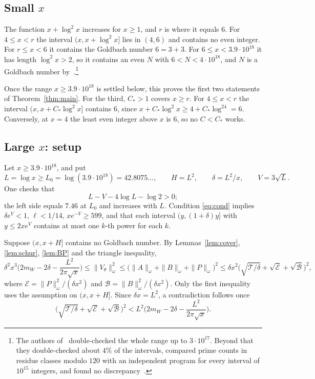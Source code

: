 \documentclass[11pt]{amsart}
\theoremstyle{remark}
\begin{document}
\subsection{Small $x$} The function $x+\log^2x$ increases for $x\ge1$, and $r$ is where it equals $6$. For $4\le x<r$ the interval $(x,x+\log^2x]$ lies in $(4,6)$ and contains no even integer. For $r\le x<6$ it contains the Goldbach number $6=3+3$. For $6\le x<3.9\cdot10^{18}$ it has length $\log^2x>2$, so it contains an even $N$ with $6<N<4\cdot10^{18}$, and $N$ is a Goldbach number by~\cite{OHP}.\footnote{The authors of~\cite{OHP} double-checked the whole range up to $3\cdot10^{17}$. Beyond that they double-checked about $4\%$ of the intervals, compared prime counts in residue classes modulo $120$ with an independent program for every interval of $10^{15}$ integers, and found no discrepancy~\cite[\S1]{OHP}.}

Once the range $x\ge3.9\cdot10^{18}$ is settled below, this proves the first two statements of Theorem~\ref{thm:main}. For the third, $C_*>1$ covers $x\ge r$. For $4\le x<r$ the interval $(x,x+C_*\log^2x]$ contains $6$, since $x+C_*\log^2x\ge4+C_*\log^24=6$. Conversely, at $x=4$ the least even integer above $x$ is $6$, so no $C<C_*$ works.

\subsection{Large $x$: setup} Let $x\ge3.9\cdot10^{18}$, and put
\[
L=\log x\ge L_0=\log(3.9\cdot10^{18})=42.8075\ldots,\qquad H=L^2,\qquad \delta=L^2/x,\qquad V=3\sqrt L .
\]
One checks that
\begin{equation}\label{eq:cond}
L-V-4\log L-\log2>0;
\end{equation}
the left side equals $7.46$ at $L_0$ and increases with $L$. Condition \eqref{eq:cond} implies $\delta e^V<1$, $\ell<1/14$, $xe^{-V}\ge599$, and that each interval $(y,(1+\delta)y]$ with $y\le2xe^V$ contains at most one $k$-th power for each $k$.

Suppose $(x,x+H]$ contains no Goldbach number. By Lemmas~\ref{lem:cover}, \ref{lem:schur}, \ref{lem:BP} and the triangle inequality,
\begin{equation}\label{eq:star}
\delta^2x^3\Big(2m_W-2\delta-\frac{L^2}{2\pi\sqrt x}\Big)\le\|V_\theta\|_\omega^2\le\big(\|A\|_\omega+\|B\|_\omega+\|P\|_\omega\big)^2\le\delta x^2\big(\sqrt{\mathcal T/\delta}+\sqrt{\mathcal E}+\sqrt{\mathcal B}\big)^2,
\end{equation}
where $\mathcal E=\|P\|_\omega^2/(\delta x^2)$ and $\mathcal B=\|B\|_\omega^2/(\delta x^2)$. Only the first inequality uses the assumption on $(x,x+H]$. Since $\delta x=L^2$, a contradiction follows once
\begin{equation}\label{eq:target}
\big(\sqrt{\mathcal T/\delta}+\sqrt{\mathcal E}+\sqrt{\mathcal B}\big)^2<L^2\Big(2m_W-2\delta-\frac{L^2}{2\pi\sqrt x}\Big).
\end{equation}
\end{document}
